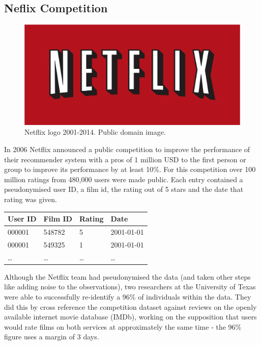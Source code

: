\documentclass[
  12pt,
]{book}
\begin{document}
\hypertarget{neflix-competition}{%
\subsection{Neflix Competition}\label{neflix-competition}}

\begin{figure}
\centering
\includegraphics{images/501-ethics-privacy/netflix-logo-old.png}
\caption{Netflix logo 2001-2014. Public domain image.}
\end{figure}

In 2006 Netflix announced a public competition to improve the performance of their recommender system with a pros of 1 million USD to the first person or group to improve its performance by at least 10\%. For this competition over 100 million ratings from 480,000 users were made public. Each entry contained a pseudonymised user ID, a film id, the rating out of 5 stars and the date that rating was given.

\begin{longtable}[]{@{}llll@{}}
\toprule()
\textbf{User ID} & \textbf{Film ID} & \textbf{Rating} & \textbf{Date} \\
\midrule()
\endhead
000001 & 548782 & 5 & 2001-01-01 \\
000001 & 549325 & 1 & 2001-01-01 \\
\ldots{} & \ldots{} & \ldots{} & \ldots{} \\
\bottomrule()
\end{longtable}

Although the Netflix team had pseudonymised the data (and taken other steps like adding noise to the observations), two researchers at the University of Texas were able to successfully re-identify a 96\% of individuals within the data. They did this by cross reference the competition dataset against reviews on the openly available internet movie database (IMDb), working on the supposition that users would rate films on both services at approximately the same time - the 96\% figure uses a margin of 3 days.
\end{document}
